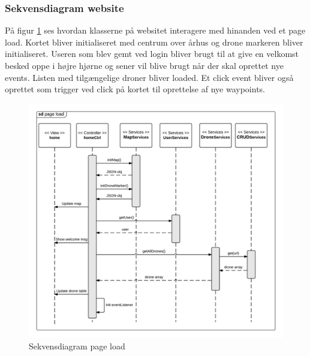 \subsubsection*{Sekvensdiagram website}
\vspace{-0.1cm}
På figur \ref{fig:page_load} ses hvordan klasserne på websitet interagere med hinanden ved et page load. Kortet bliver initialiseret med centrum over århus og drone markeren bliver initialiseret. Useren som blev gemt ved login bliver brugt til at give en velkomst besked oppe i højre hjørne og sener vil blive brugt når der skal oprettet nye events. Listen med tilgængelige droner bliver loaded. Et click event bliver også oprettet som trigger ved click på kortet til oprettelse af nye waypoints.
\begin{figure}[H]
	\centering
	\includegraphics[width=1\textwidth]{Billeder/sekvens/sd_page_load.png}
	\caption{Sekvensdiagram page load}
	\label{fig:page_load}
\end{figure}

